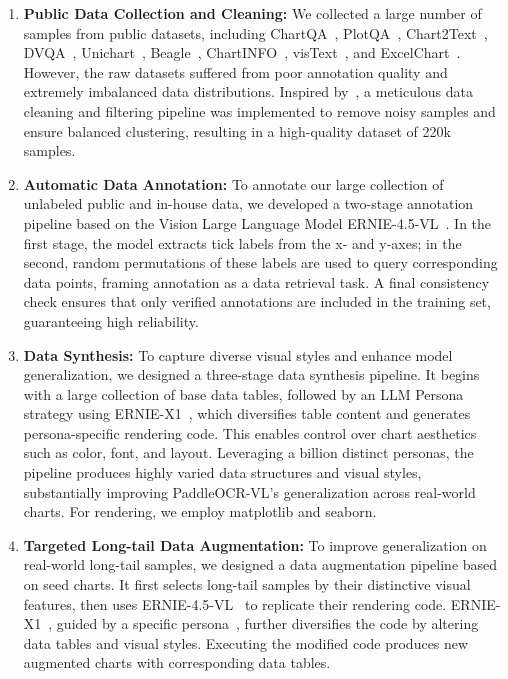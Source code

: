 \documentclass[11pt, a4paper,logo,  copyright, nonumbering]{paddleocr}
\begin{document}
\begin{enumerate}[label=\arabic*.]


\item \textbf{Public Data Collection and Cleaning:} We collected a large number of samples from public datasets, including ChartQA~\cite{chartqa}, PlotQA~\cite{plotqa}, Chart2Text~\cite{chart2text}, DVQA~\cite{dvqa}, Unichart~\cite{masry2023unichart}, Beagle~\cite{beagle}, ChartINFO~\cite{chartinfo}, visText~\cite{tang2023vistext}, and ExcelChart~\cite{excelchart}. However, the raw datasets suffered from poor annotation quality and extremely imbalanced data distributions. Inspired by~\cite{llavachart}, a meticulous data cleaning and filtering pipeline was implemented to remove noisy samples and ensure balanced clustering, resulting in a high-quality dataset of 220k samples.


\item \textbf{Automatic Data Annotation:} To annotate our large collection of unlabeled public and in-house data, we developed a two-stage annotation pipeline based on the Vision Large Language Model ERNIE-4.5-VL~\cite{ernie2025technicalreport}. In the first stage, the model extracts tick labels from the x- and y-axes; in the second, random permutations of these labels are used to query corresponding data points, framing annotation as a data retrieval task. A final consistency check ensures that only verified annotations are included in the training set, guaranteeing high reliability.


\item \textbf{Data Synthesis:} To capture diverse visual styles and enhance model generalization, we designed a three-stage data synthesis pipeline. It begins with a large collection of base data tables, followed by an LLM Persona~\cite{ge2024scaling} strategy using ERNIE-X1~\cite{ernie2025technicalreport}, which diversifies table content and generates persona-specific rendering code. This enables control over chart aesthetics such as color, font, and layout. Leveraging a billion distinct personas, the pipeline produces highly varied data structures and visual styles, substantially improving PaddleOCR-VL’s generalization across real-world charts. For rendering, we employ matplotlib and seaborn.

\item \textbf{Targeted Long-tail Data Augmentation:} To improve generalization on real-world long-tail samples, we designed a data augmentation pipeline based on seed charts. It first selects long-tail samples by their distinctive visual features, then uses ERNIE-4.5-VL~\cite{ernie2025technicalreport} to replicate their rendering code. ERNIE-X1~\cite{ernie2025technicalreport}, guided by a specific persona~\cite{ge2024scaling}, further diversifies the code by altering data tables and visual styles. Executing the modified code produces new augmented charts with corresponding data tables.

\end{enumerate}
\end{document}
